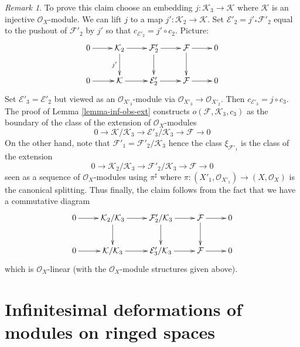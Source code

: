 \documentclass{stacks-project}
\theoremstyle{plain}
\theoremstyle{definition}
\theoremstyle{remark}
\newtheorem{remark}[subsection]{Remark}
\numberwithin{equation}{subsection}
\begin{document}
\begin{remark}
\medskip\noindent
To prove this claim choose an embedding $j : \mathcal{K}_3 \to \mathcal{K}$
where $\mathcal{K}$ is an injective $\mathcal{O}_X$-module.
We can lift $j$ to a map $j' : \mathcal{K}_2 \to \mathcal{K}$.
Set $\mathcal{E}'_2 = j'_*\mathcal{F}'_2$ equal to the pushout
of $\mathcal{F}'_2$ by $j'$ so that $c_{\mathcal{E}'_2} = j' \circ c_2$.
Picture:
$$
\xymatrix{
0 \ar[r] &
\mathcal{K}_2 \ar[r] \ar[d]_{j'} &
\mathcal{F}'_2 \ar[r] \ar[d] &
\mathcal{F} \ar[r] \ar[d] & 0 \\
0 \ar[r] &
\mathcal{K} \ar[r] &
\mathcal{E}'_2 \ar[r] &
\mathcal{F} \ar[r] & 0
}
$$
Set $\mathcal{E}'_3 = \mathcal{E}'_2$ but viewed as an
$\mathcal{O}_{X'_3}$-module via $\mathcal{O}_{X'_3} \to \mathcal{O}_{X'_2}$.
Then $c_{\mathcal{E}'_3} = j \circ c_3$.
The proof of Lemma \ref{lemma-inf-obs-ext} constructs
$o(\mathcal{F}, \mathcal{K}_3, c_3)$
as the boundary of the class of the extension of $\mathcal{O}_X$-modules
$$
0 \to
\mathcal{K}/\mathcal{K}_3 \to
\mathcal{E}'_3/\mathcal{K}_3 \to
\mathcal{F} \to 0
$$
On the other hand, note that $\mathcal{F}'_1 = \mathcal{F}'_2/\mathcal{K}_3$
hence the class $\xi_{\mathcal{F}'_1}$ is the class
of the extension
$$
0 \to \mathcal{K}_2/\mathcal{K}_3 \to \mathcal{F}'_2/\mathcal{K}_3
\to \mathcal{F} \to 0
$$
seen as a sequence of $\mathcal{O}_X$-modules using $\pi^\sharp$
where $\pi : (X'_1, \mathcal{O}_{X'_1}) \to (X, \mathcal{O}_X)$
is the canonical splitting.
Thus finally, the claim follows from the fact that we have
a commutative diagram
$$
\xymatrix{
0 \ar[r] &
\mathcal{K}_2/\mathcal{K}_3 \ar[r] \ar[d] &
\mathcal{F}'_2/\mathcal{K}_3 \ar[r] \ar[d] &
\mathcal{F} \ar[r] \ar[d] & 0 \\
0 \ar[r] &
\mathcal{K}/\mathcal{K}_3 \ar[r] &
\mathcal{E}'_3/\mathcal{K}_3 \ar[r] &
\mathcal{F} \ar[r] & 0
}
$$
which is $\mathcal{O}_X$-linear (with the $\mathcal{O}_X$-module
structures given above).
\end{remark}








\section{Infinitesimal deformations of modules on ringed spaces}
\label{section-deformation-modules}
\end{document}
